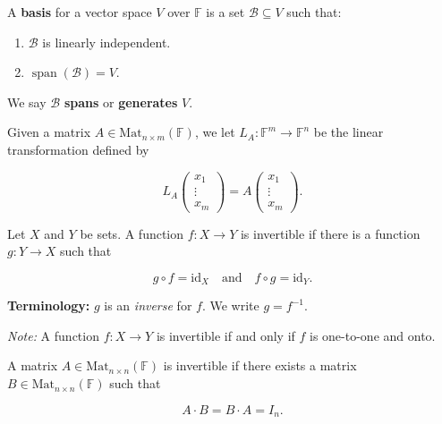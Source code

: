 \documentclass{article}
\begin{document}
\begin{definition}[Basis]
    A \textbf{basis} for a vector space \( V \) over \( \mathbb{F} \) is a set \( \mathcal{B} \subseteq V \) such that:
    \begin{enumerate}
        \item \(\mathcal{B}\) is linearly independent.
        \item \(\operatorname{span}(\mathcal{B}) = V\).
    \end{enumerate}
    We say \(\mathcal{B}\) \textbf{spans} or \textbf{generates} \( V \).
\end{definition}

\begin{definition}
Given a matrix \( A \in \text{Mat}_{n \times m}(\mathbb{F}) \), we let \( L_A: \mathbb{F}^m \to \mathbb{F}^n \) be the linear transformation defined by

\[
L_A \begin{pmatrix}
x_1 \\
\vdots \\
x_m
\end{pmatrix} = A \begin{pmatrix}
x_1 \\
\vdots \\
x_m
\end{pmatrix}.
\]
\end{definition}




\begin{definition}[Invertibility]
Let \( X \) and \( Y \) be sets. A function \( f: X \to Y \) is invertible if there is a function \( g: Y \to X \) such that 

\[
g \circ f = \mathrm{id}_X \quad \text{and} \quad f \circ g = \mathrm{id}_Y.
\]

\textbf{Terminology:} \( g \) is an \emph{inverse} for \( f \). We write \( g = f^{-1} \).

\emph{Note: }A function \( f: X \to Y \) is invertible if and only if \( f \) is one-to-one and onto.

\end{definition}


\begin{definition}
A matrix \( A \in \mathrm{Mat}_{n \times n}(\mathbb{F}) \) is invertible if there exists a matrix \( B \in \mathrm{Mat}_{n \times n}(\mathbb{F}) \) such that 

\[
A \cdot B = B \cdot A = I_n.
\]
\end{definition}
\end{document}
